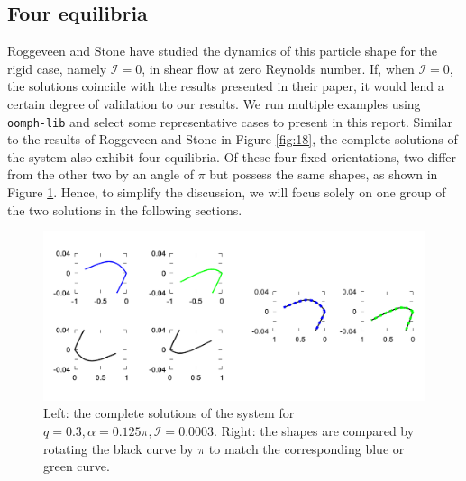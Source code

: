 \documentclass[a4paper,12pt]{report}
\begin{document}
\subsection{Four equilibria}
Roggeveen and Stone \cite{roggeveen2022motion} have studied the dynamics of this particle shape for the rigid case, namely $\mathcal{I}=0$, in shear flow at zero Reynolds number. If, when $\mathcal{I}=0$, the solutions coincide with the results presented in their paper, it would lend a certain degree of validation to our results.
We run multiple examples using \texttt{oomph-lib} and select some representative cases to present in this report. Similar to the results of Roggeveen and Stone in Figure \ref{fig:18}, the complete solutions of the system also exhibit four equilibria. Of these four fixed orientations, two differ from the other two by an angle of $\pi$ but possess the same shapes, as shown in Figure \ref{fig:20}. Hence, to simplify the discussion, we will focus solely on one group of the two solutions in the following sections.
\begin{figure}[!h]
	\begin{center}
		\includegraphics[width=1\textwidth]{plot/four_solutions2.png}
		\caption{Left: the complete solutions of the system for $q=0.3, \alpha=0.125\pi, \mathcal{I}=0.0003$. Right: the shapes are compared by rotating the black curve by $\pi$ to match the corresponding blue or green curve.}
		\label{fig:20}
	\end{center}
\end{figure}
\end{document}
